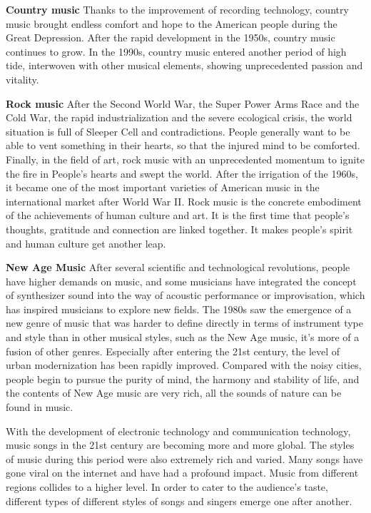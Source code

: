\documentclass[conference]{IEEEtran}
\begin{document}
\textbf{Country music}
Thanks to the improvement of recording technology, country music brought endless comfort and hope to the American people during the Great Depression. After the rapid development in the 1950s, country music continues to grow. In the 1990s, country music entered another period of high tide, interwoven with other musical elements, showing unprecedented passion and vitality.

\textbf{Rock music}
After the Second World War, the Super Power Arms Race and the Cold War, the rapid industrialization and the severe ecological crisis, the world situation is full of Sleeper Cell and contradictions. People generally want to be able to vent something in their hearts, so that the injured mind to be comforted. Finally, in the field of art, rock music with an unprecedented momentum to ignite the fire in People’s hearts and swept the world. After the irrigation of the 1960s, it became one of the most important varieties of American music in the international market after World War II. Rock music is the concrete embodiment of the achievements of human culture and art. It is the first time that people’s thoughts, gratitude and connection are linked together. It makes people’s spirit and human culture get another leap.

\textbf{New Age Music}
After several scientific and technological revolutions, people have higher demands on music, and some musicians have integrated the concept of synthesizer sound into the way of acoustic performance or improvisation, which has inspired musicians to explore new fields. The 1980s saw the emergence of a new genre of music that was harder to define directly in terms of instrument type and style than in other musical styles, such as the New Age music, it’s more of a fusion of other genres. Especially after entering the 21st century, the level of urban modernization has been rapidly improved. Compared with the noisy cities, people begin to pursue the purity of mind, the harmony and stability of life, and the contents of New Age music are very rich, all the sounds of nature can be found in music.

With the development of electronic technology and communication technology, music songs in the 21st century are becoming more and more global. The styles of music during this period were also extremely rich and varied. Many songs have gone viral on the internet and have had a profound impact. Music from different regions collides to a higher level. In order to cater to the audience’s taste, different types of different styles of songs and singers emerge one after another.
\end{document}
